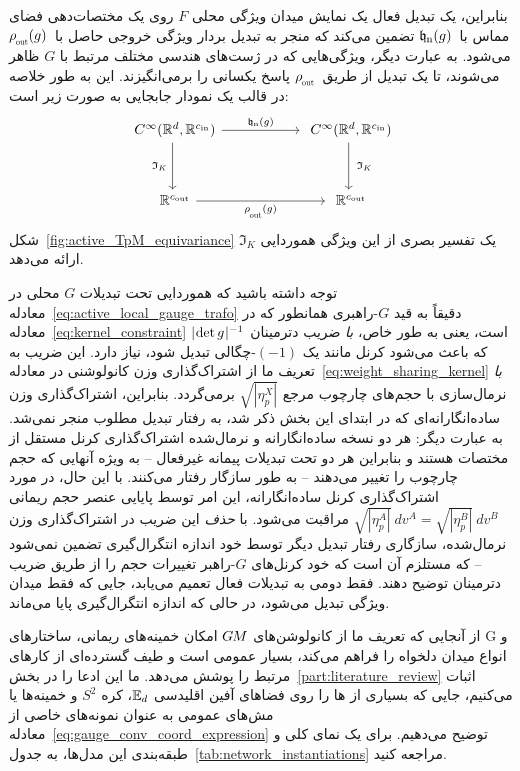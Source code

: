 بنابراین، یک تبدیل فعال یک نمایش میدان ویژگی محلی $F$ روی یک مختصات‌دهی فضای مماس با~$\mathfrak{b}_{\mkern-5mu\textup{in}}(g)$ تضمین می‌کند که منجر به تبدیل بردار ویژگی خروجی حاصل با~$\rhoout(g)$ می‌شود.
به عبارت دیگر، ویژگی‌هایی که در ژست‌های هندسی مختلف مرتبط با $G$ ظاهر می‌شوند، تا یک تبدیل از طریق~$\rhoout$ پاسخ یکسانی را برمی‌انگیزند.
این به طور خلاصه در قالب یک نمودار جابجایی به صورت زیر است:
\begin{equation}\label{cd:active_G_equivariance}
	\begin{tikzcd}[column sep=56pt, row sep=34pt, font=\normalsize]
		C^\infty(\R^d,\R^{\cin})
		\arrow[d, "\mathfrak{I}_K\,"']
		\arrow[r, "\mathfrakb_{\mkern-5mu\textup{in}}(g)"]
		&
		C^\infty(\R^d,\R^{\cin})
		\arrow[d, "\ \mathfrak{I}_K"]
		\\
		\R^{\cout}
		\arrow[r, "\rhoout(g)"']
		&
		\R^{\cout}
	\end{tikzcd}
\end{equation}
شکل~\ref{fig:active_TpM_equivariance} یک تفسیر بصری از این ویژگی هموردایی $\mathfrak{I}_K$ ارائه می‌دهد.

توجه داشته باشید که هموردایی تحت تبدیلات $G$ محلی در معادله~\eqref{eq:active_local_gauge_trafo} دقیقاً به قید $G$-راهبری همانطور که در معادله~\eqref{eq:kernel_constraint} است، یعنی به طور خاص، \emph{با} ضریب دترمینان $|\mkern-2mu \det g \mkern1mu|^{-1}$ که باعث می‌شود کرنل مانند یک $(-1)$-چگالی تبدیل شود، نیاز دارد.
این ضریب به تعریف ما از اشتراک‌گذاری وزن کانولوشنی در معادله~\eqref{eq:weight_sharing_kernel} \emph{با} نرمال‌سازی با حجم‌های چارچوب مرجع $\sqrt{|\eta_p^X|}$ برمی‌گردد.
بنابراین، اشتراک‌گذاری وزن ساده‌انگارانه‌ای که در ابتدای این بخش ذکر شد، به رفتار تبدیل مطلوب منجر نمی‌شد.
به عبارت دیگر: هر دو نسخه ساده‌انگارانه و نرمال‌شده اشتراک‌گذاری کرنل مستقل از مختصات هستند و بنابراین هر دو تحت تبدیلات پیمانه غیرفعال -- به ویژه آنهایی که حجم چارچوب را تغییر می‌دهند -- به طور سازگار رفتار می‌کنند.
با این حال، در مورد اشتراک‌گذاری کرنل ساده‌انگارانه، این امر توسط پایایی عنصر حجم ریمانی $\sqrt{|\eta_p^A|}\ dv^A = \sqrt{|\eta_p^B|}\ dv^B$ مراقبت می‌شود.
با \emph{حذف} این ضریب در اشتراک‌گذاری وزن نرمال‌شده، سازگاری رفتار تبدیل دیگر توسط خود اندازه انتگرال‌گیری تضمین نمی‌شود -- که مستلزم آن است که خود کرنل‌های $G$-راهبر تغییرات حجم را از طریق ضریب دترمینان توضیح دهند.
فقط دومی به تبدیلات فعال تعمیم می‌یابد، جایی که فقط میدان ویژگی تبدیل می‌شود، در حالی که اندازه انتگرال‌گیری پایا می‌ماند.

از آنجایی که تعریف ما از کانولوشن‌های $G\mkern-1.4muM$ امکان خمینه‌های ریمانی، ساختارهای G و انواع میدان دلخواه را فراهم می‌کند، بسیار عمومی است و طیف گسترده‌ای از کارهای مرتبط را پوشش می‌دهد.
ما این ادعا را در بخش~\ref{part:literature_review} اثبات می‌کنیم، جایی که بسیاری از \cnn{}ها را روی فضاهای آفین اقلیدسی $\mathbb{E}_d$، کره $S^2$ و خمینه‌ها یا مش‌های عمومی به عنوان نمونه‌های خاصی از معادله~\eqref{eq:gauge_conv_coord_expression} توضیح می‌دهیم.
برای یک نمای کلی و طبقه‌بندی این مدل‌ها، به جدول~\ref{tab:network_instantiations} مراجعه کنید.